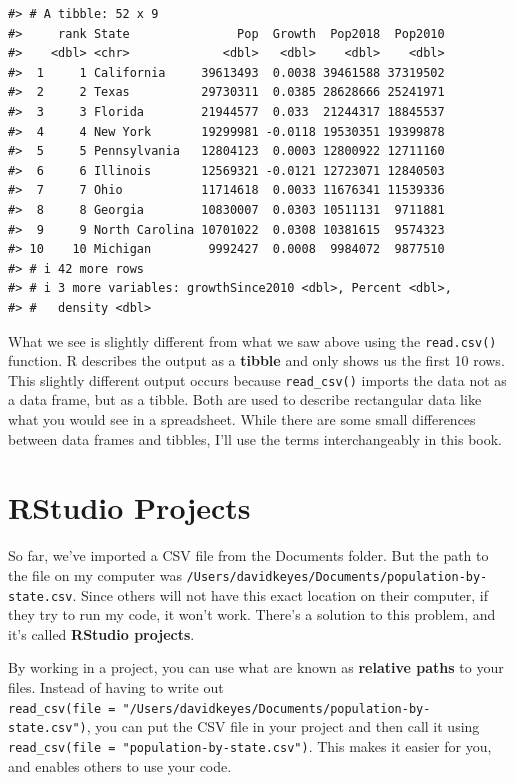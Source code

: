 \documentclass[
]{book}
\begin{document}
\begin{verbatim}
#> # A tibble: 52 x 9
#>     rank State               Pop  Growth  Pop2018  Pop2010
#>    <dbl> <chr>             <dbl>   <dbl>    <dbl>    <dbl>
#>  1     1 California     39613493  0.0038 39461588 37319502
#>  2     2 Texas          29730311  0.0385 28628666 25241971
#>  3     3 Florida        21944577  0.033  21244317 18845537
#>  4     4 New York       19299981 -0.0118 19530351 19399878
#>  5     5 Pennsylvania   12804123  0.0003 12800922 12711160
#>  6     6 Illinois       12569321 -0.0121 12723071 12840503
#>  7     7 Ohio           11714618  0.0033 11676341 11539336
#>  8     8 Georgia        10830007  0.0303 10511131  9711881
#>  9     9 North Carolina 10701022  0.0308 10381615  9574323
#> 10    10 Michigan        9992427  0.0008  9984072  9877510
#> # i 42 more rows
#> # i 3 more variables: growthSince2010 <dbl>, Percent <dbl>,
#> #   density <dbl>
\end{verbatim}

What we see is slightly different from what we saw above using the \texttt{read.csv()} function. R describes the output as a \textbf{tibble} and only shows us the first 10 rows. This slightly different output occurs because \texttt{read\_csv()} imports the data not as a data frame, but as a tibble. Both are used to describe rectangular data like what you would see in a spreadsheet. While there are some small differences between data frames and tibbles, I'll use the terms interchangeably in this book.

\hypertarget{rstudio-projects}{%
\section*{RStudio Projects}\label{rstudio-projects}}

So far, we've imported a CSV file from the Documents folder. But the path to the file on my computer was \texttt{/Users/davidkeyes/Documents/population-by-state.csv}. Since others will not have this exact location on their computer, if they try to run my code, it won't work. There's a solution to this problem, and it's called \textbf{RStudio projects}.

By working in a project, you can use what are known as \textbf{relative paths} to your files. Instead of having to write out \texttt{read\_csv(file\ =\ "/Users/davidkeyes/Documents/population-by-state.csv")}, you can put the CSV file in your project and then call it using \texttt{read\_csv(file\ =\ "population-by-state.csv")}. This makes it easier for you, and enables others to use your code.
\end{document}
